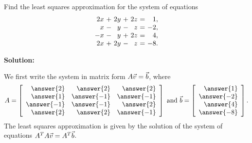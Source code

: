 \documentclass{ximera}
\begin{document}
\begin{example}\label{ex:least-squares-approximation}
  Find the least squares approximation for the system of equations
  \begin{equation*}
    \begin{array}{r@{~}c@{~}r@{~}c@{~}r@{~}c@{~}r}
      2x &+& 2y &+& 2z &=&  1, \\
      x  &-&  y &-&  z &=& -2, \\
      -x &-&  y &+& 2z &=&  4, \\
      2x &+& 2y &-&  z &=& -8. \\
    \end{array}
  \end{equation*}

  \textbf{Solution:}

  We first write the system in matrix form $A\vec{v}=\vec{b}$, where
  \begin{equation*}
    A = \startmat{rrr}
      \answer{2} & \answer{2} & \answer{2} \\
      \answer{1} & \answer{-1} & \answer{-1} \\
      \answer{-1} & \answer{-1} & \answer{2} \\
      \answer{2} & \answer{2} & \answer{-1} \\
    \stopmat
    \quad\mbox{and}\quad
    \vect{b} = \startmat{r} 
      \answer{1} \\ 
      \answer{-2} \\ 
      \answer{4} \\ 
      \answer{-8} 
    \stopmat.
\end{equation*}
  The least
  squares approximation is given by the solution of the system of
  equations $A^TA\vec{v} = A^T\vec{b}$. 
  

\end{example}
\end{document}
